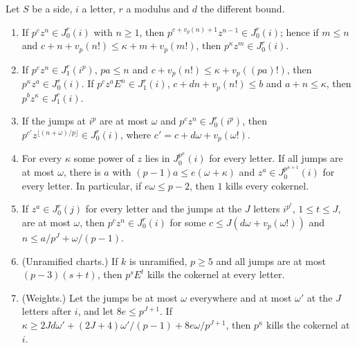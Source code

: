 \begin{lemma}\label{lem:z-powers}
Let $S$ be a side, $i$ a letter, $r$ a modulus and $d$ the different bound.
\begin{enumerate}[label=\textup{(\alph*)}]
\item If $p^cz^n\in J^r_0(i)$ with $n\ge1$, then $p^{c+v_p(n)+1}z^{n-1}\in J^r_0(i)$; hence if $m\le n$ and $c+n+v_p(n!)\le\kappa+m+v_p(m!)$, then $p^\kappa z^m\in J^r_0(i)$.
\item If $p^cz^n\in J^r_1(i^p)$, $pa\le n$ and $c+v_p(n!)\le\kappa+v_p((pa)!)$, then $p^\kappa z^a\in J^r_0(i)$. If $p^cz^aE^n\in J^r_1(i)$, $c+dn+v_p(n!)\le b$ and $a+n\le\kappa$, then $p^bz^\kappa\in J^r_1(i)$.
\item If the jumps at $i^p$ are at most $\omega$ and $p^cz^n\in J^r_0(i^p)$, then $p^{c'}z^{\lfloor(n+\omega)/p\rfloor}\in J^r_0(i)$, where $c'=c+d\omega+v_p(\omega!)$.
\item For every $\kappa$ some power of $z$ lies in $J^{p^\kappa}_0(i)$ for every letter. If all jumps are at most $\omega$, there is $a$ with $(p-1)a\le e(\omega+\kappa)$ and $z^a\in J^{p^{\kappa+1}}_0(i)$ for every letter. In particular, if $e\omega\le p-2$, then $1$ kills every cokernel.
\item If $z^a\in J^r_0(j)$ for every letter and the jumps at the $J$ letters $i^{p^t}$, $1\le t\le J$, are at most $\omega$, then $p^cz^n\in J^r_0(i)$ for some $c\le J(d\omega+v_p(\omega!))$ and $n\le a/p^J+\omega/(p-1)$.
\item (Unramified charts.) If $k$ is unramified, $p\ge5$ and all jumps are at most $(p-3)(s+t)$, then $p^sE^t$ kills the cokernel at every letter.
\item (Weights.) Let the jumps be at most $\omega$ everywhere and at most $\omega'$ at the $J$ letters after $i$, and let $8e\le p^{J+1}$. If $\kappa\ge2Jd\omega'+(2J+4)\omega'/(p-1)+8e\omega/p^{J+1}$, then $p^\kappa$ kills the cokernel at $i$.
\end{enumerate}
\end{lemma}

